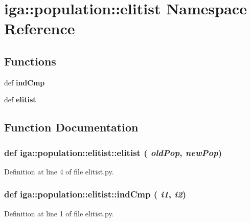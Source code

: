 \section{iga::population::elitist Namespace Reference}
\label{namespaceiga_1_1population_1_1elitist}


\subsection*{Functions}
\begin{CompactItemize}
\item 
def {\bf indCmp}
\item 
def {\bf elitist}
\end{CompactItemize}


\subsection{Function Documentation}
\subsubsection{\setlength{\rightskip}{0pt plus 5cm}def iga::population::elitist::elitist ( {\em oldPop},  {\em newPop})}\label{namespaceiga_1_1population_1_1elitist_332471378041c3df868a0ef72516e42c}




Definition at line 4 of file elitist.py.
\subsubsection{\setlength{\rightskip}{0pt plus 5cm}def iga::population::elitist::indCmp ( {\em i1},  {\em i2})}\label{namespaceiga_1_1population_1_1elitist_5ac0956ec858f0df54fb979a34a1e9d1}




Definition at line 1 of file elitist.py.
